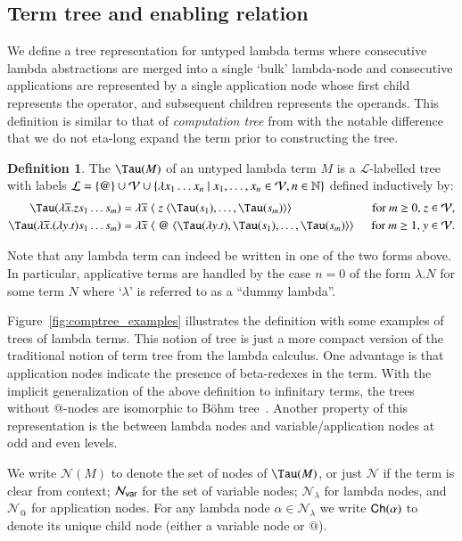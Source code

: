 \documentclass{elsarticle}
\makeatletter
\theoremstyle{plain}
\theoremstyle{definition}
\newtheorem{definition}{Definition}[section]
\newcommand\VarSet{\mathcal{V}}
\newcommand\Nodes{\mathcal{N}}%
\newcommand\NodesVar{\Nodes_{\sf var}}%
\newcommand\NodesLmd{\Nodes_\lambda}%
\newcommand\NodesApp{\Nodes_@}%
\newcommand{\child}{{\small \sf Ch}} %
\newcommand{\ctree}{\Tau} %
\makeatother
\begin{document}
\subsection{Term tree and enabling relation}

We define a tree representation for untyped lambda terms where consecutive lambda abstractions are merged into a single `bulk' lambda-node and consecutive applications are represented by a single application node whose first child represents the operator, and subsequent children represents the operands.
This definition is similar to that of \emph{computation tree} from \cite{OngLics2006, BlumPhd} with the notable difference that we do not eta-long expand the term prior to constructing the tree.
\begin{definition}
The  $\ctree(M)$ of an
 untyped lambda term $M$ is a $\mathcal{L}$-labelled tree
with labels
$\mathcal{L} = \{ @ \} \union \VarSet \union \{ \lambda x_1 \ldots x_n \ | \ x_1 ,\ldots, x_n \in
    \VarSet, n\in\nat \}$
defined inductively by:
\begin{align*}
    \ctree(\lambda \overline{x} . z s_1 \ldots s_m) &= \lambda \overline{x}\; \langle\; z\; \langle \ctree(s_1),\ldots,\ctree(s_m)\rangle\rangle
&    \hbox{for $m\geq 0$, $z \in \VarSet$},
\\
\ctree(\lambda \overline{x} . (\lambda y.t) s_1 \ldots s_m) &= \lambda \overline{x}\; \langle\; @ \; \langle \ctree(\lambda y.t),\ctree(s_1),\ldots,\ctree(s_m) \rangle \rangle \enspace
&  \hbox{for $m\geq 1$, $y\in \VarSet$}.
\end{align*}

Note that any lambda term can indeed be written in one of the two forms above. In particular, applicative terms are handled by the case $n=0$ of the form $\lambda . N$ for some term $N$ where `$\lambda$' is referred to as a ``dummy lambda''.

Figure~\ref{fig:comptree_examples} illustrates the definition with some examples of trees of lambda terms.
This notion of tree is just a more compact version of the traditional notion of term tree from the lambda calculus. One advantage is that application nodes indicate the presence of beta-redexes in the term.
With the implicit generalization of the above definition to infinitary terms,
the trees without @-nodes are isomorphic to B\"ohm tree~\cite{Barendregt84}.
Another property of this representation is the  between lambda nodes and variable/application nodes at odd and even levels.

We write $\Nodes(M)$ to denote the set of nodes of $\ctree(M)$, or just $\Nodes$ if the term is clear from context; $\NodesVar$ for the set of variable nodes; $\NodesLmd$ for lambda nodes, and $\NodesApp$ for  application nodes. For any lambda node $\alpha\in\NodesLmd$ we write $\child(\alpha)$ to denote its unique child node (either a variable node or $@$).
\end{definition}
\end{document}

